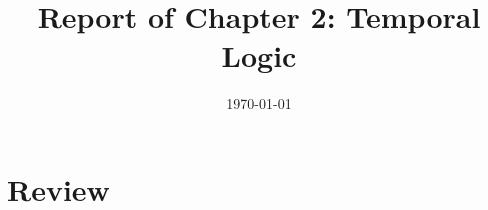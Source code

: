 \documentclass[11pt, conference]{IEEEtran}
\begin{document}
    \title{Report of Chapter 2: Temporal Logic}
    \author{}
    \date{\today}
    \maketitle

    \section{Review}
\end{document}
